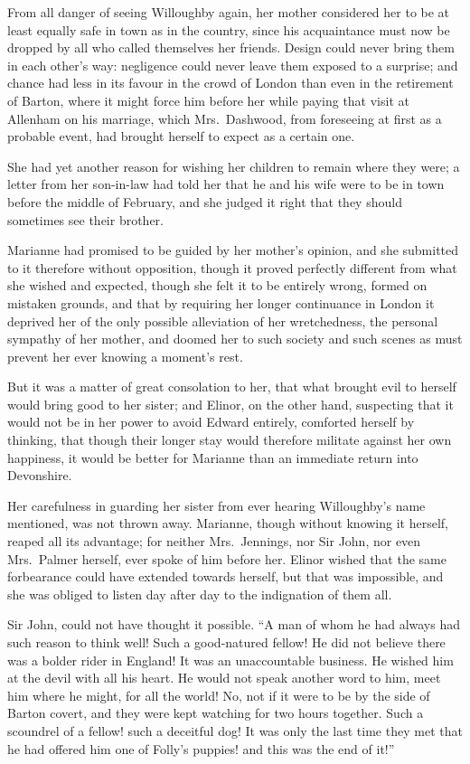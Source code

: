 From all danger of seeing Willoughby again,
her mother considered her to be at least equally safe
in town as in the country, since his acquaintance must
now be dropped by all who called themselves her friends.
Design could never bring them in each other's way:
negligence could never leave them exposed to a surprise;
and chance had less in its favour in the crowd of London
than even in the retirement of Barton, where it might
force him before her while paying that visit at Allenham
on his marriage, which Mrs.\ Dashwood, from foreseeing at
first as a probable event, had brought herself to expect
as a certain one.

She had yet another reason for wishing her children
to remain where they were; a letter from her son-in-law
had told her that he and his wife were to be in town
before the middle of February, and she judged it right
that they should sometimes see their brother.

Marianne had promised to be guided by her mother's opinion,
and she submitted to it therefore without opposition,
though it proved perfectly different from what she wished
and expected, though she felt it to be entirely wrong,
formed on mistaken grounds, and that by requiring her
longer continuance in London it deprived her of the only
possible alleviation of her wretchedness, the personal
sympathy of her mother, and doomed her to such society and
such scenes as must prevent her ever knowing a moment's rest.

But it was a matter of great consolation to her,
that what brought evil to herself would bring good to
her sister; and Elinor, on the other hand, suspecting that
it would not be in her power to avoid Edward entirely,
comforted herself by thinking, that though their longer
stay would therefore militate against her own happiness,
it would be better for Marianne than an immediate return
into Devonshire.

Her carefulness in guarding her sister from ever
hearing Willoughby's name mentioned, was not thrown away.
Marianne, though without knowing it herself, reaped all
its advantage; for neither Mrs.\ Jennings, nor Sir John,
nor even Mrs.\ Palmer herself, ever spoke of him before her.
Elinor wished that the same forbearance could have extended
towards herself, but that was impossible, and she was
obliged to listen day after day to the indignation of them all.

Sir John, could not have thought it possible.
``A man of whom he had always had such reason to think well!
Such a good-natured fellow!  He did not believe there was a
bolder rider in England!  It was an unaccountable business.
He wished him at the devil with all his heart.  He would
not speak another word to him, meet him where he might,
for all the world!  No, not if it were to be by the side
of Barton covert, and they were kept watching for two
hours together.  Such a scoundrel of a fellow! such
a deceitful dog!  It was only the last time they met
that he had offered him one of Folly's puppies! and this
was the end of it!''

